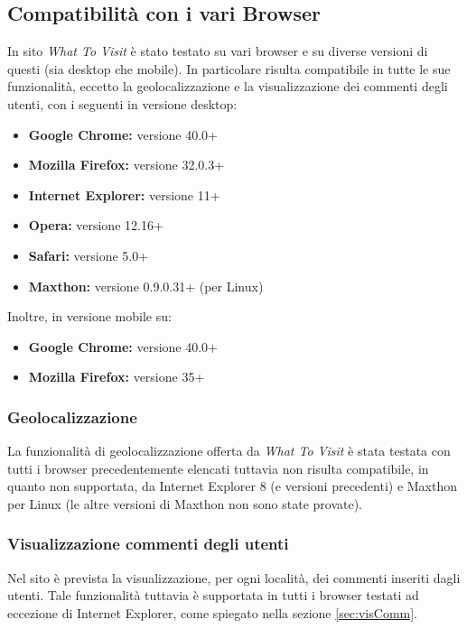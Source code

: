 \subsection{Compatibilità con i vari Browser}
In sito \textit{What To Visit} è stato testato su vari browser e su
diverse versioni di questi (sia desktop che mobile). 
In particolare risulta compatibile in tutte le sue funzionalità, 
eccetto la geolocalizzazione e la visualizzazione dei commenti
degli utenti, con i seguenti in versione desktop:
\begin{itemize}
\item \textbf{Google Chrome:} versione 40.0+ 
\item \textbf{Mozilla Firefox:} versione 32.0.3+
\item \textbf{Internet Explorer:} versione 11+
\item \textbf{Opera:} versione 12.16+
\item \textbf{Safari:} versione 5.0+
\item \textbf{Maxthon:} versione 0.9.0.31+ (per Linux)
\end{itemize}

Inoltre, in versione mobile su:
\begin{itemize}
\item \textbf{Google Chrome:} versione 40.0+ 
\item \textbf{Mozilla Firefox:} versione 35+  
\end{itemize}

\subsubsection{Geolocalizzazione}
La funzionalità di geolocalizzazione offerta da \textit{What To Visit} è stata
testata con tutti i browser precedentemente elencati tuttavia non risulta compatibile,
in quanto non supportata, da Internet Explorer 8 (e versioni precedenti) e Maxthon per Linux (le altre versioni di Maxthon non sono state provate).

\subsubsection{Visualizzazione commenti degli utenti}
Nel sito è prevista la visualizzazione, per ogni località, dei commenti inseriti dagli utenti.
Tale funzionalità tuttavia è supportata in tutti i browser testati ad eccezione di Internet Explorer, come spiegato nella sezione \ref{sec:visComm}.
